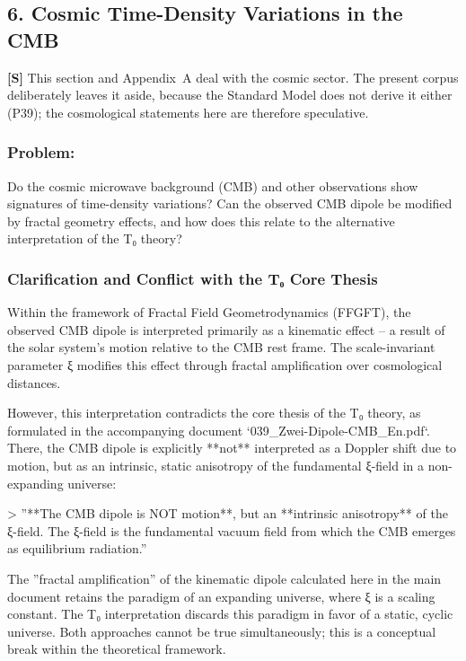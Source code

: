 	
	\subsection*{6. Cosmic Time-Density Variations in the CMB}

\textbf{[S]} This section and Appendix~A deal with the cosmic sector. The present corpus deliberately leaves it aside, because the Standard Model does not derive it either (P39); the cosmological statements here are therefore speculative.
	
	\subsubsection*{Problem:}
	Do the cosmic microwave background (CMB) and other observations show signatures of time-density variations? Can the observed CMB dipole be modified by fractal geometry effects, and how does this relate to the alternative interpretation of the T₀ theory?
	
	\subsubsection*{Clarification and Conflict with the T₀ Core Thesis}
	
	Within the framework of Fractal Field Geometrodynamics (FFGFT), the observed CMB dipole is interpreted primarily as a kinematic effect – a result of the solar system's motion relative to the CMB rest frame. The scale-invariant parameter ξ modifies this effect through fractal amplification over cosmological distances.
	
	However, this interpretation contradicts the core thesis of the T₀ theory, as formulated in the accompanying document `039\_Zwei-Dipole-CMB\_En.pdf`. There, the CMB dipole is explicitly **not** interpreted as a Doppler shift due to motion, but as an intrinsic, static anisotropy of the fundamental ξ-field in a non-expanding universe:
	
	> ''**The CMB dipole is NOT motion**, but an **intrinsic anisotropy** of the ξ-field. The ξ-field is the fundamental vacuum field from which the CMB emerges as equilibrium radiation.''
	
	The ''fractal amplification'' of the kinematic dipole calculated here in the main document retains the paradigm of an expanding universe, where ξ is a scaling constant. The T₀ interpretation discards this paradigm in favor of a static, cyclic universe. Both approaches cannot be true simultaneously; this is a conceptual break within the theoretical framework.
	
